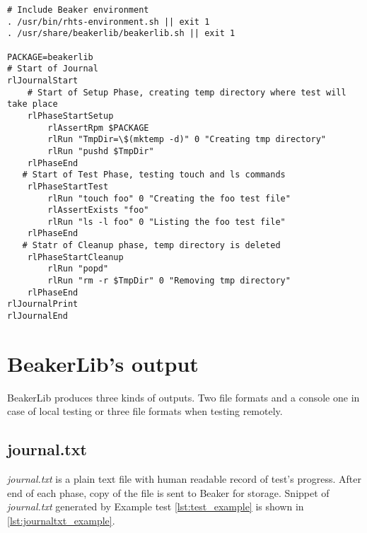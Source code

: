 \begin{minipage}{\linewidth}
\begin{lstlisting}[style=beakerlib_bash,caption={Example of basic BeakerLib test},label={lst:test_example}]
# Include Beaker environment
. /usr/bin/rhts-environment.sh || exit 1
. /usr/share/beakerlib/beakerlib.sh || exit 1

PACKAGE=beakerlib
# Start of Journal
rlJournalStart
    # Start of Setup Phase, creating temp directory where test will take place 
    rlPhaseStartSetup
        rlAssertRpm $PACKAGE
        rlRun "TmpDir=\$(mktemp -d)" 0 "Creating tmp directory"
        rlRun "pushd $TmpDir"
    rlPhaseEnd
   # Start of Test Phase, testing touch and ls commands
    rlPhaseStartTest
        rlRun "touch foo" 0 "Creating the foo test file"
        rlAssertExists "foo"
        rlRun "ls -l foo" 0 "Listing the foo test file"
    rlPhaseEnd
   # Statr of Cleanup phase, temp directory is deleted
    rlPhaseStartCleanup
        rlRun "popd"
        rlRun "rm -r $TmpDir" 0 "Removing tmp directory"
    rlPhaseEnd
rlJournalPrint
rlJournalEnd
\end{lstlisting}
\end{minipage}

\section{BeakerLib's output}
BeakerLib produces three kinds of outputs. Two file formats and a console one in case of local testing or three file formats when testing remotely.

\subsection{journal.txt}
\textit{journal.txt} is a plain text file with human readable record of test's progress. After end of each phase, copy of the file is sent to Beaker for storage. Snippet of \textit{journal.txt} generated by Example test \ref{lst:test_example} is shown in \ref{lst:journaltxt_example}.

